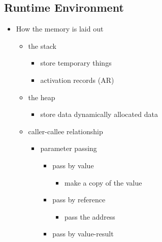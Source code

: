 \documentclass[11pt]{article}
\begin{document}
\subsection{Runtime Environment}
\label{sec:org7980202}
\begin{itemize}
\item How the memory is laid out
\begin{itemize}
\item the stack 
\begin{itemize}
\item store temporary things
\item activation records (AR)
\end{itemize}
\item the heap
\begin{itemize}
\item store data dynamically allocated data
\end{itemize}
\item caller-callee relationship
\begin{itemize}
\item parameter passing
\begin{itemize}
\item pass by value
\begin{itemize}
\item make a copy of the value
\end{itemize}
\item pass by reference
\begin{itemize}
\item pass the address
\end{itemize}
\item pass by value-result
\end{itemize}
\end{itemize}
\end{itemize}
\end{itemize}
\end{document}
